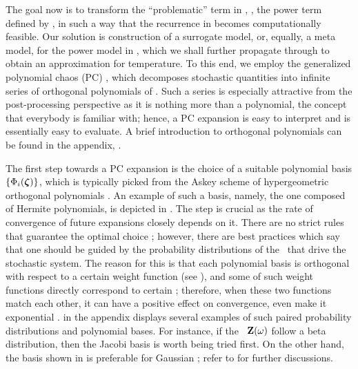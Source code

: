 The goal now is to transform the ``problematic'' term in , \ie, the power term defined by , in such a way that the recurrence in  becomes computationally feasible. Our solution is construction of a surrogate model, or, equally, a meta model, for the power model in , which we shall further propagate through  to obtain an approximation for temperature. To this end, we employ the generalized polynomial chaos (PC) \cite{xiu2002}, which decomposes stochastic quantities into infinite series of orthogonal polynomials of \rvs. Such a series is especially attractive from the post-processing perspective as it is nothing more than a polynomial, the concept that everybody is familiar with; hence, a PC expansion is easy to interpret and is essentially easy to evaluate. A brief introduction to orthogonal polynomials can be found in the appendix, .

The first step towards a PC expansion is the choice of a suitable polynomial basis $\{ \Phi_i(\boldsymbol{\zeta}) \}$, which is typically picked from the Askey scheme of hypergeometric orthogonal polynomials \cite{xiu2002}. An example of such a basis, namely, the one composed of Hermite polynomials, is depicted in . The step is crucial as the rate of convergence of future expansions closely depends on it. There are no strict rules that guarantee the optimal choice \cite{maitre2010, knio2006}; however, there are best practices which say that one should be guided by the probability distributions of the \rvs\ that drive the stochastic system. The reason for this is that each polynomial basis is orthogonal with respect to a certain weight function (see ), and some of such weight functions directly correspond to certain \pdfs; therefore, when these two functions match each other, it can have a positive effect on convergence, even make it exponential \cite{xiu2002}.  in the appendix displays several examples of such paired probability distributions and polynomial bases. For instance, if the \rvs\ $\mathbf{Z}(\omega)$ follow a beta distribution, then the Jacobi basis is worth being tried first. On the other hand, the basis shown in  is preferable for Gaussian \rvs; refer to \cite{xiu2010, xiu2002} for further discussions.

